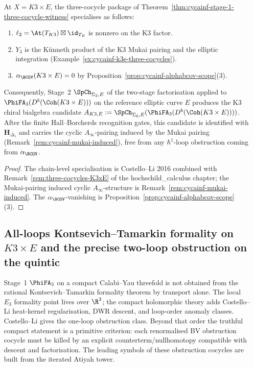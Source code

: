 \begin{corollary}
\label{cor:cycainf-stage-2-k3e}
At $X = K3 \times E$, the three-cocycle package of
Theorem~\ref{thm:cycainf-stage-1-three-cocycle-witness} specialises
as follows:
\begin{enumerate}
\item $\ell_2 = \At(T_{K3}) \boxtimes \id_{T_E}$ is nonzero on the K3
factor.
\item $Y_3$ is the K\"unneth product of the K3 Mukai pairing and the
elliptic integration (Example~\ref{ex:cycainf-k3e-three-cocycles}).
\item $\alpha_{\BCOV}(K3 \times E) = 0$ by Proposition~\ref{prop:cycainf-alphabcov-scope}(3).
\end{enumerate}
Consequently, Stage~2 $\SpCh_{\Sigma_2, E}$ of the two-stage
factorisation applied to $\PhiFA_3(D^b(\Coh(K3 \times E)))$ on the
reference elliptic curve $E$ produces the K3 chiral bialgebra candidate
$A_{K3,E}:=\SpCh_{\Sigma_2,E}(\PhiFA_3(D^b(\Coh(K3\times E))))$.
After the finite Hall--Borcherds recognition gates, this candidate is
identified with $\mathbf H_{\Delta_5}$ and carries the cyclic
$A_\infty$-pairing induced by the Mukai pairing
(Remark~\ref{rem:cycainf-mukai-induced}), free from any $\hbar^1$-loop
obstruction coming from $\alpha_{\BCOV}$.
\end{corollary}

\begin{proof}
The chain-level specialisation is Costello--Li 2016 combined with
Remark~\textup{\ref{rem:three-cocycles-K3xE}} of the hochschild\_calculus
chapter; the Mukai-pairing induced cyclic $A_\infty$-structure is
Remark~\ref{rem:cycainf-mukai-induced}. The $\alpha_{\BCOV}$-vanishing
is Proposition~\ref{prop:cycainf-alphabcov-scope}(3).
\end{proof}

\subsection{All-loops Kontsevich--Tamarkin formality on \texorpdfstring{$K3 \times E$}{K3 x E} and the precise two-loop obstruction on the quintic}
\label{subsec:cycainf-all-loops-k3e-quintic}

Stage~1 $\PhiFA_3$ on a compact Calabi--Yau threefold is not obtained
from the rational Kontsevich--Tamarkin formality theorem by transport
alone. The local $E_3$ formality point lives over $\R^3$; the compact
holomorphic theory adds Costello--Li heat-kernel regularisation,
DWR descent, and loop-order anomaly classes. Costello--Li gives the
one-loop obstruction class. Beyond that order the truthful compact
statement is a primitive criterion: each renormalised BV obstruction
cocycle must be killed by an explicit counterterm/nullhomotopy
compatible with descent and factorisation. The leading symbols of
these obstruction cocycles are built from the iterated Atiyah tower.

